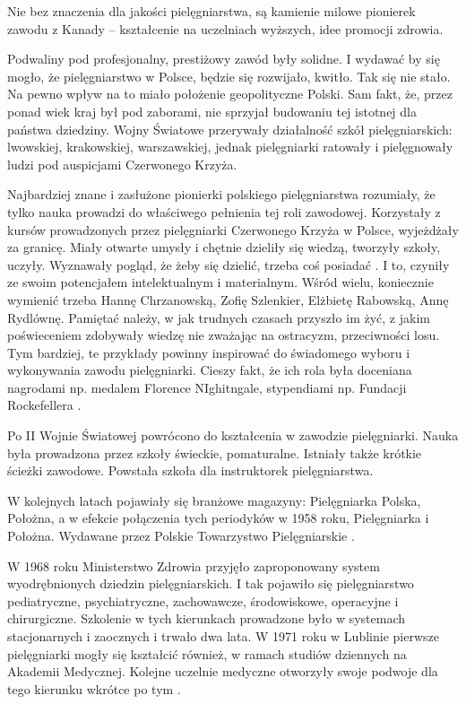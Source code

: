 \documentclass[a4paper,12pt,twoside,openany]{report}
\begin{document}
Nie bez znaczenia dla jakości pielęgniarstwa, są kamienie milowe pionierek zawodu z Kanady – kształcenie na uczelniach wyższych, idee promocji zdrowia.

Podwaliny pod profesjonalny, prestiżowy zawód były solidne. I wydawać by się mogło, że pielęgniarstwo w Polsce, będzie się rozwijało, kwitło. Tak się nie stało. Na pewno wpływ na to miało położenie geopolityczne Polski. Sam fakt, że, przez ponad wiek kraj był pod zaborami, nie sprzyjał budowaniu tej istotnej dla państwa dziedziny. Wojny Światowe przerywały działalność szkół pielęgniarskich: lwowskiej, krakowskiej, warszawskiej, jednak pielęgniarki ratowały i pielęgnowały ludzi pod auspicjami Czerwonego Krzyża.

Najbardziej znane i zasłużone pionierki polskiego pielęgniarstwa rozumiały, że tylko nauka prowadzi do właściwego pełnienia tej roli zawodowej. Korzystały z kursów prowadzonych przez pielęgniarki Czerwonego Krzyża  w Polsce, wyjeżdżały za granicę. Miały otwarte umysły i chętnie dzieliły się wiedzą, tworzyły szkoły, uczyły.  Wyznawały pogląd, że żeby się dzielić, trzeba coś posiadać \cite{ikonpol}. I to, czyniły ze swoim potencjałem intelektualnym i materialnym. Wśród wielu, koniecznie wymienić trzeba Hannę Chrzanowską, Zofię Szlenkier, Elżbietę Rabowską, Annę Rydlównę. Pamiętać należy, w jak trudnych czasach przyszło im żyć, z jakim poświeceniem zdobywały wiedzę nie zważając na ostracyzm, przeciwności losu. Tym bardziej, te przykłady powinny inspirować do świadomego wyboru i wykonywania zawodu pielęgniarki. Cieszy fakt, że ich rola była doceniana nagrodami np. medalem Florence NIghitngale, stypendiami np. Fundacji Rockefellera \cite{50}.

Po II Wojnie Światowej powrócono do kształcenia w zawodzie pielęgniarki. Nauka była prowadzona przez szkoły świeckie, pomaturalne. Istniały także krótkie ścieżki zawodowe. Powstała szkoła dla instruktorek pielęgniarstwa.

W kolejnych latach pojawiały się branżowe magazyny: Pielęgniarka Polska, Położna, a w efekcie połączenia tych periodyków w 1958 roku, Pielęgniarka i Położna. Wydawane przez Polskie Towarzystwo Pielęgniarskie \cite{czas}.

W 1968 roku Ministerstwo Zdrowia przyjęło zaproponowany system wyodrębnionych dziedzin pielęgniarskich. I tak pojawiło się pielęgniarstwo pediatryczne, psychiatryczne, zachowawcze, środowiskowe, operacyjne i chirurgiczne. Szkolenie w tych kierunkach prowadzone było w systemach stacjonarnych i zaocznych i trwało dwa lata. W 1971 roku w Lublinie pierwsze pielęgniarki mogły się kształcić również, w ramach studiów dziennych na Akademii Medycznej. Kolejne uczelnie medyczne otworzyły swoje podwoje dla tego kierunku wkrótce po tym \cite{spec}.
 
\end{document}
